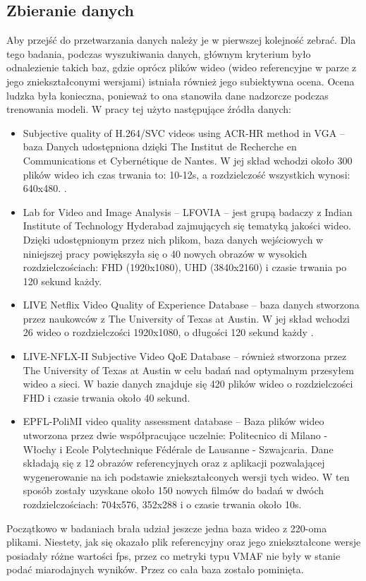 \subsection{Zbieranie danych}
Aby przejść do przetwarzania danych należy je w pierwszej kolejność zebrać. Dla tego badania, podczas wyszukiwania danych, głównym kryterium było odnalezienie takich baz, gdzie oprócz plików wideo (wideo referencyjne w parze z jego zniekształconymi wersjami) istniała również jego subiektywna ocena. Ocena ludzka była konieczna, ponieważ to ona stanowiła dane nadzorcze podczas trenowania modeli. W pracy tej użyto następujące źródła danych:
\begin{itemize}
\item Subjective quality of H.264/SVC videos using ACR-HR method in VGA -- baza Danych udostępniona dzięki The Institut de Recherche en Communications et Cybernétique de Nantes. W jej skład wchodzi około 300 plików wideo ich czas trwania to: 10-12s, a rozdzielczość wszystkich wynosi: 640x480. \cite{pitrey:hal-00608310}.
\item Lab for Video and Image Analysis – LFOVIA -- jest grupą badaczy z Indian Institute of Technology Hyderabad zajmujących się tematyką jakości wideo. Dzięki udostępnionym przez nich plikom,  baza danych wejściowych w niniejszej pracy powiększyła się o 40 nowych obrazów w wysokich rozdzielczościach: FHD (1920x1080), UHD (3840x2160) i czasie trwania po 120 sekund każdy\cite{india}.
\item LIVE Netflix Video Quality of Experience Database -- baza danych stworzona przez naukowców z The University of Texas at Austin. W jej skład wchodzi 26 wideo o rozdzielczości 1920x1080, o długości 120 sekund każdy \cite{netflix_1}\cite{netflix_11}.
\item LIVE-NFLX-II Subjective Video QoE Database -- również stworzona przez The University of Texas at Austin w celu badań nad optymalnym przesyłem wideo a sieci. W bazie danych znajduje się 420 plików wideo o rozdzielczości FHD i czasie trwania około 40 sekund.
\item EPFL-PoliMI video quality assessment database -- Baza plików wideo utworzona przez dwie współpracujące uczelnie: Politecnico di Milano - Włochy i Ecole Polytechnique Fédérale de Lausanne - Szwajcaria. Dane składają się z 12 obrazów referencyjnych oraz z aplikacji pozwalającej wygenerowanie na ich podstawie zniekształconych wersji tych wideo. W ten sposób zostały uzyskane około 150 nowych filmów do badań w dwóch rozdzielczościach: 704x576, 352x288 i o czasie trwania około 10s\cite{italy}\cite{italy_2}\cite{italy_3}.
\end{itemize}
Początkowo w badaniach brała udział jeszcze jedna baza wideo z 220-oma plikami. Niestety, jak się okazało plik referencyjny oraz jego zniekształcone wersje posiadały różne wartości fps, przez co metryki typu VMAF nie były w stanie podać miarodajnych wyników. Przez co cała baza zostało pominięta.\par

